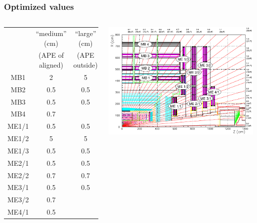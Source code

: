 \documentclass[compress]{beamer}
\begin{document}
\begin{frame}
\frametitle{Optimized values}


\begin{columns}
\begin{tabular}{c | c c}
& ``medium'' (cm) & ``large'' (cm) \\
& (APE of aligned) & (APE outside) \\\hline
MB1 & 2 & 5 \\
MB2 & 0.5 & 0.5 \\
MB3 & 0.5 & 0.5 \\
MB4 & 0.7 & \\
ME1/1 & 0.5 & 0.5 \\
ME1/2 & 5 & 5 \\
ME1/3 & 0.5 & 0.5 \\
ME2/1 & 0.5 & 0.5 \\
ME2/2 & 0.7 & 0.7 \\
ME3/1 & 0.5 & 0.5 \\
ME3/2 & 0.7 & \\
ME4/1 & 0.5 & \\
\end{tabular}

\includegraphics[width=\linewidth]{muon_system_labeled.pdf}
\end{columns}
\end{frame}
\end{document}
